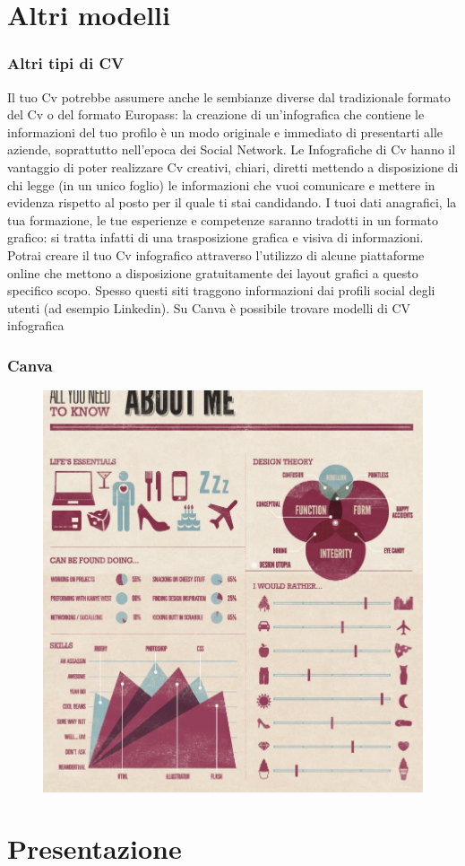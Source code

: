 \documentclass[handout]{beamer}
\begin{document}
\section{Altri modelli}

\begin{frame}
\frametitle{Altri tipi di CV}
Il tuo Cv potrebbe assumere anche le sembianze diverse dal tradizionale formato del Cv o del
formato Europass: la creazione di un'infografica che contiene le informazioni del tuo profilo è un
modo originale e immediato di presentarti alle aziende, soprattutto nell'epoca dei Social Network.
Le Infografiche di Cv hanno il vantaggio di poter realizzare Cv creativi, chiari, diretti mettendo a
disposizione di chi legge (in un unico foglio) le informazioni che vuoi comunicare e mettere in
evidenza rispetto al posto per il quale ti stai candidando. I tuoi dati anagrafici, la tua formazione, le
tue esperienze e competenze saranno tradotti in un formato grafico: si tratta infatti di una
trasposizione grafica e visiva di informazioni. Potrai creare il tuo Cv infografico attraverso l'utilizzo di
alcune piattaforme online che mettono a disposizione gratuitamente dei layout grafici a questo
specifico scopo. Spesso questi siti traggono informazioni dai profili social degli utenti (ad esempio
Linkedin). Su Canva è possibile trovare modelli di CV infografica
  

\end{frame}


\begin{frame}
\frametitle{Canva}
\begin{figure}
  \includegraphics[width=.5\columnwidth]{img/cvinfografica.png}
\end{figure}
\end{frame}

\section{Presentazione}
\end{document}
